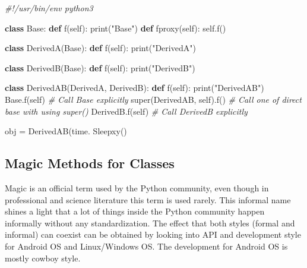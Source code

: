 \documentclass[
]{article}
\newenvironment{Shaded}{}{}
\newcommand{\BuiltInTok}[1]{#1}
\newcommand{\CommentTok}[1]{\textcolor[rgb]{0.38,0.63,0.69}{\textit{#1}}}
\newcommand{\KeywordTok}[1]{\textcolor[rgb]{0.00,0.44,0.13}{\textbf{#1}}}
\newcommand{\NormalTok}[1]{#1}
\newcommand{\OperatorTok}[1]{\textcolor[rgb]{0.40,0.40,0.40}{#1}}
\newcommand{\StringTok}[1]{\textcolor[rgb]{0.25,0.44,0.63}{#1}}
\newcommand{\VariableTok}[1]{\textcolor[rgb]{0.10,0.09,0.49}{#1}}
\begin{document}
\begin{Shaded}
\begin{Highlighting}[]

\CommentTok{\#!/usr/bin/env python3}

\KeywordTok{class}\NormalTok{ Base:}
  \KeywordTok{def}\NormalTok{ f(}\VariableTok{self}\NormalTok{): }\BuiltInTok{print}\NormalTok{(}\StringTok{"Base"}\NormalTok{)}
  \KeywordTok{def}\NormalTok{ fproxy(}\VariableTok{self}\NormalTok{): }\VariableTok{self}\NormalTok{.f() }

\KeywordTok{class}\NormalTok{ DerivedA(Base):}
  \KeywordTok{def}\NormalTok{ f(}\VariableTok{self}\NormalTok{): }\BuiltInTok{print}\NormalTok{(}\StringTok{"DerivedA"}\NormalTok{)}

\KeywordTok{class}\NormalTok{ DerivedB(Base):}
  \KeywordTok{def}\NormalTok{ f(}\VariableTok{self}\NormalTok{): }\BuiltInTok{print}\NormalTok{(}\StringTok{"DerivedB"}\NormalTok{)}


\KeywordTok{class}\NormalTok{ DerivedAB(DerivedA, DerivedB):}
  \KeywordTok{def}\NormalTok{ f(}\VariableTok{self}\NormalTok{): }
      \BuiltInTok{print}\NormalTok{(}\StringTok{"DerivedAB"}\NormalTok{)}
\NormalTok{      Base.f(}\VariableTok{self}\NormalTok{)                 }\CommentTok{\# Call Base explicitly}
      \BuiltInTok{super}\NormalTok{(DerivedAB, }\VariableTok{self}\NormalTok{).f()   }\CommentTok{\# Call one of direct base with using super()}
\NormalTok{      DerivedB.f(}\VariableTok{self}\NormalTok{)             }\CommentTok{\# Call DerivedB explicitly}

\NormalTok{obj }\OperatorTok{=}\NormalTok{ DerivedAB(time. Sleepxy()}
\end{Highlighting}
\end{Shaded}

\hypertarget{magic-methods-for-classes}{%
\subsection{Magic Methods for Classes}\label{magic-methods-for-classes}}

Magic is an official term used by the Python community, even though in
professional and science literature this term is used rarely. This
informal name shines a light that a lot of things inside the Python
community happen informally without any standardization. The effect that
both styles (formal and informal) can coexist can be obtained by looking
into API and development style for Android OS and Linux/Windows OS. The
development for Android OS is mostly cowboy style.
\end{document}
